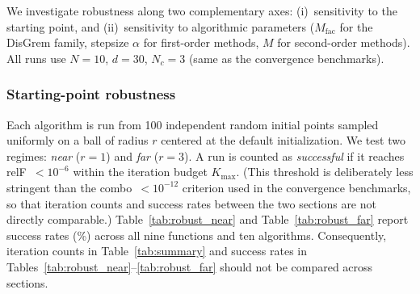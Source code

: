\documentclass[11pt,a4paper]{article}
\begin{document}
	We investigate robustness along two complementary axes:
	(i)~sensitivity to the starting point, and
	(ii)~sensitivity to algorithmic parameters ($M_{\mathrm{fac}}$ for
	the DisGrem family, stepsize $\alpha$ for first-order methods, $M$
	for second-order methods).
	All runs use $N{=}10$, $d{=}30$, $N_c{=}3$ (same as the convergence
	benchmarks).
	
	\subsubsection{Starting-point robustness}
	
	Each algorithm is run from 100 independent random initial points
	sampled uniformly on a ball of radius $r$ centered at the default
	initialization.
	We test two regimes: \textit{near} ($r{=}1$) and \textit{far}
	($r{=}3$).
	A run is counted as \emph{successful} if it reaches relF~$<10^{-6}$
	within the iteration budget $K_{\max}$.
	(This threshold is deliberately less stringent than the combo~$<10^{-12}$
	criterion used in the convergence benchmarks, so that iteration counts
	and success rates between the two sections are not directly comparable.)
	Table~\ref{tab:robust_near} and Table~\ref{tab:robust_far} report
	success rates (\%) across all nine functions and ten algorithms.
	Consequently, iteration counts in Table~\ref{tab:summary}
	and success rates in Tables~\ref{tab:robust_near}--\ref{tab:robust_far}
	should not be compared across sections.
	
\end{document}
